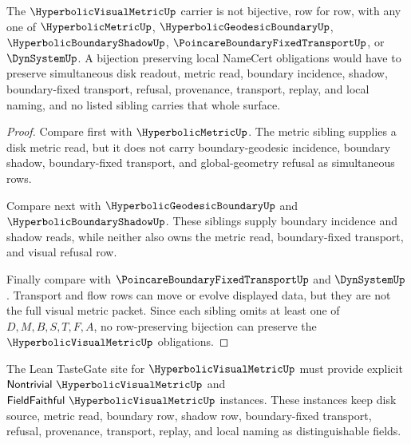 \begin{theorem}
\label{thm:hyperbolic-visual-metric-sibling-separation}
The $\HyperbolicVisualMetricUp$ carrier is not bijective, row for row, with any one of $\HyperbolicMetricUp$, $\HyperbolicGeodesicBoundaryUp$, $\HyperbolicBoundaryShadowUp$, $\PoincareBoundaryFixedTransportUp$, or $\DynSystemUp$. A bijection preserving local NameCert obligations would have to preserve simultaneous disk readout, metric read, boundary incidence, shadow, boundary-fixed transport, refusal, provenance, transport, replay, and local naming, and no listed sibling carries that whole surface.
\end{theorem}
\begin{proof}
Compare first with $\HyperbolicMetricUp$. The metric sibling supplies a disk metric read, but it does not carry boundary-geodesic incidence, boundary shadow, boundary-fixed transport, and global-geometry refusal as simultaneous rows.

Compare next with $\HyperbolicGeodesicBoundaryUp$ and $\HyperbolicBoundaryShadowUp$. These siblings supply boundary incidence and shadow reads, while neither also owns the metric read, boundary-fixed transport, and visual refusal row.

Finally compare with $\PoincareBoundaryFixedTransportUp$ and $\DynSystemUp$. Transport and flow rows can move or evolve displayed data, but they are not the full visual metric packet. Since each sibling omits at least one of $D,M,B,S,T,F,A$, no row-preserving bijection can preserve the $\HyperbolicVisualMetricUp$ obligations.
\end{proof}



The Lean TasteGate site for $\HyperbolicVisualMetricUp$ must provide explicit $\mathsf{Nontrivial}\ \HyperbolicVisualMetricUp$ and $\mathsf{FieldFaithful}\ \HyperbolicVisualMetricUp$ instances. These instances keep disk source, metric read, boundary row, shadow row, boundary-fixed transport, refusal, provenance, transport, replay, and local naming as distinguishable fields.

